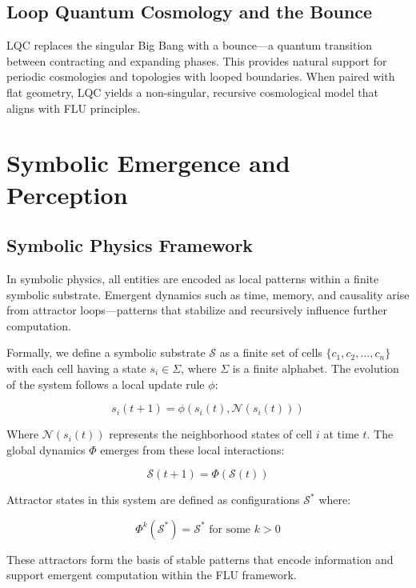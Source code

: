 \documentclass[12pt]{article}
\begin{document}
\subsection{Loop Quantum Cosmology and the Bounce}
LQC replaces the singular Big Bang with a bounce---a quantum transition between contracting and expanding phases. This provides natural support for periodic cosmologies and topologies with looped boundaries. When paired with flat geometry, LQC yields a non-singular, recursive cosmological model that aligns with FLU principles.

\section{Symbolic Emergence and Perception}

\subsection{Symbolic Physics Framework}
In symbolic physics, all entities are encoded as local patterns within a finite symbolic substrate. Emergent dynamics such as time, memory, and causality arise from attractor loops---patterns that stabilize and recursively influence further computation.

Formally, we define a symbolic substrate $\mathcal{S}$ as a finite set of cells $\{c_1, c_2, \ldots, c_n\}$ with each cell having a state $s_i \in \Sigma$, where $\Sigma$ is a finite alphabet. The evolution of the system follows a local update rule $\phi$:

\begin{equation}
s_i(t+1) = \phi(s_i(t), \mathcal{N}(s_i(t)))
\end{equation}

Where $\mathcal{N}(s_i(t))$ represents the neighborhood states of cell $i$ at time $t$. The global dynamics $\Phi$ emerges from these local interactions:

\begin{equation}
\mathcal{S}(t+1) = \Phi(\mathcal{S}(t))
\end{equation}

Attractor states in this system are defined as configurations $\mathcal{S}^*$ where:

\begin{equation}
\Phi^k(\mathcal{S}^*) = \mathcal{S}^* \text{ for some } k > 0
\end{equation}

These attractors form the basis of stable patterns that encode information and support emergent computation within the FLU framework.
\end{document}
